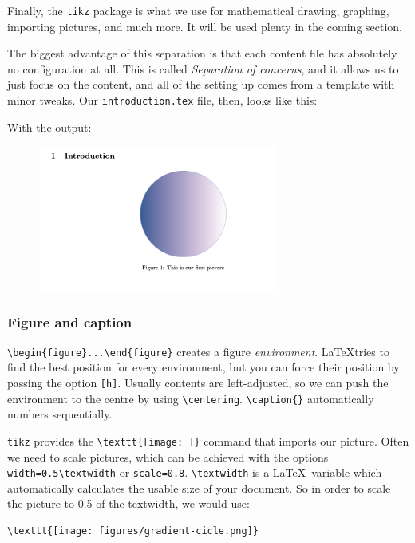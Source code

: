 Finally, the \verb|tikz| package is what we use for mathematical drawing, graphing, importing pictures, and much more.
It will be used plenty in the coming section.

The biggest advantage of this separation is that each content file has absolutely no configuration at all.
This is called \emph{Separation of concerns}, and it allows us to just focus on the content, and all of the setting up comes from a template with minor tweaks.
Our \verb|introduction.tex| file, then, looks like this:

With the output:
\begin{figure}[h]
    \centering
        \includegraphics[width=0.7\textwidth]{figures/figures.png}
    \label{fig:figures}
\end{figure}

\subsubsection{Figure and caption}
\verb|\begin{figure}...\end{figure}| creates a figure \emph{environment}.
\LaTeX tries to find the best position for every environment, but you can force their position by passing the option \verb|[h]|.
Usually contents are left-adjusted, so we can push the environment to the centre by using \verb|\centering|.
\verb|\caption{}| automatically numbers sequentially.

\verb|tikz| provides the \verb|\texttt{[image: ]}| command that imports our picture.
Often we need to scale pictures, which can be achieved with the options \verb|width=0.5\textwidth| or \verb|scale=0.8|.
\verb|\textwidth| is a \LaTeX\ variable which automatically calculates the usable size of your document.
So in order to scale the picture to 0.5 of the textwidth, we would use:
\begin{lstlisting}
\texttt{[image: figures/gradient-cicle.png]}
\end{lstlisting}

